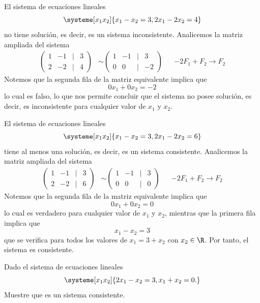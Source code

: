 \documentclass[compacto,10pt]{pubciencias-notas}
\begin{document}
\begin{ejem}\hspace{0pt} 
El sistema de ecuaciones lineales
\[
    \systeme[x_1 x_2]{x_1 -x_2 = 3,
        2x_1 -2x_2 = 4}
\]
no tiene solución, es decir, es un sistema inconsistente. Analicemos la matriz ampliada del sistema
\begin{align*}
    \begin{pmatrix}
    1&-1&|&3\\
    2&-2&|&4
    \end{pmatrix}
    &\sim
    \begin{pmatrix}
    1&-1&|&3\\
    0&0&|&-2
    \end{pmatrix} 
    && -2F_{1} + F_{2} \to F_{2}
\end{align*}
Notemos que la segunda fila de la matriz equivalente implica que
\[
    0x_{1} + 0x_{2} = -2
\]
lo cual es falso, lo que nos permite concluir que el sistema no posee solución, es decir, es inconsistente para cualquier valor de $x_{1}$ y $x_{2}$.
\end{ejem}

\begin{ejem}\hspace{0pt} 
El sistema de ecuaciones lineales
\[
    \systeme[x_1 x_2]{x_1 -x_2 = 3,
        2x_1 -2x_2 = 6}
\]
tiene al menos una solución, es decir, es un sistema consistente. Analicemos la matriz ampliada del sistema
\begin{align*}
    \begin{pmatrix}
    1&-1&|&3\\
    2&-2&|&6
    \end{pmatrix}
    &\sim
    \begin{pmatrix}
    1&-1&|&3\\
    0&0&|&0
    \end{pmatrix} 
    && -2F_{1} + F_{2} \to F_{2}
\end{align*}
Notemos que la segunda fila de la matriz equivalente implica que
\[
    0x_{1} + 0x_{2} = 0
\]
lo cual es verdadero para cualquier valor de $x_{1}$ y $x_{2}$, mientras que la primera fila implica que
\[
    x_{1} - x_{2} = 3
\]
que se verifica para todos los valores de $x_{1} = 3 + x_{2}$ con $x_{2}\in\R$. Por tanto, el sistema es consistente.
\end{ejem}

\begin{ejer}\hspace{0pt} 
Dado el sistema de ecuaciones lineales
\[
    \systeme[x_1 x_2]{2x_1 -x_2 = 3,
        x_1 +x_2 = 0.}
\]
Muestre que es un sistema consistente.
\end{ejer}
\end{document}

